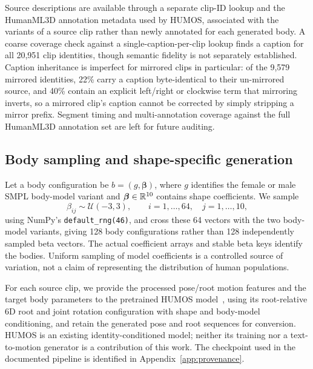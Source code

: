 Source descriptions are available through a separate clip-ID lookup and the
HumanML3D annotation metadata used by HUMOS, associated with the variants of
a source clip rather than newly annotated for each generated body. A coarse
coverage check against a single-caption-per-clip lookup finds a caption for
all 20,951 clip identities, though semantic fidelity is not separately
established. Caption inheritance is imperfect for mirrored clips in
particular: of the 9,579 mirrored identities, 22\% carry a caption
byte-identical to their un-mirrored source, and 40\% contain an explicit
left/right or clockwise term that mirroring inverts, so a mirrored clip's
caption cannot be corrected by simply stripping a mirror prefix. Segment
timing and multi-annotation coverage against the full HumanML3D annotation
set are left for future auditing.

\subsection{Body sampling and shape-specific generation}\label{sec:body_generation}

Let a body configuration be $b=(g,\boldsymbol{\beta})$, where $g$ identifies the
female or male SMPL body-model variant and
$\boldsymbol{\beta}\in\mathbb{R}^{10}$ contains shape coefficients. We sample
\begin{equation}
    \beta_{ij}\sim\mathcal{U}(-3,3),\qquad
    i=1,\ldots,64,\quad j=1,\ldots,10,
    \label{eq:shape_sampling}
\end{equation}
using NumPy's \texttt{default\_rng(46)}, and cross these 64 vectors with the two
body-model variants, giving 128 body configurations rather than 128
independently sampled beta vectors. The actual coefficient arrays and stable
beta keys identify the bodies. Uniform sampling of model coefficients is a
controlled source of variation, not a claim of representing the distribution
of human populations.

For each source clip, we provide the processed pose/root motion features and
the target body parameters to the pretrained HUMOS
model~\cite{humos}, using its root-relative 6D root and joint rotation
configuration with shape and body-model conditioning, and retain the
generated pose and root sequences for conversion. HUMOS is an existing
identity-conditioned model; neither its training nor a text-to-motion
generator is a contribution of this work. The checkpoint used in the
documented pipeline is identified in Appendix~\ref{app:provenance}.

